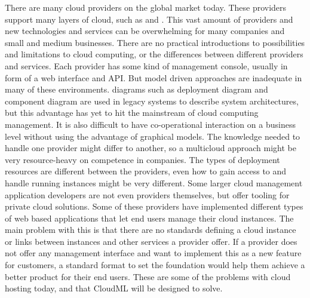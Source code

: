 There are many cloud providers on the global market today. 
These providers support many layers of cloud, such as  and .
This vast amount of providers and new technologies and services can be overwhelming 
for many companies and small and medium businesses. 
There are no practical introductions to possibilities and limitations to cloud computing, 
or the differences between different providers and services. 
Each provider has some kind of management console, usually in form of a web interface and API. 
But model driven approaches are inadequate in many of these environments. 
 diagrams such as deployment diagram and component diagram are used in legacy systems 
to describe system architectures, 
but this advantage has yet to hit the mainstream of cloud computing management. 
It is also difficult to have co-operational interaction on a business level without 
using the advantage of graphical models.
The knowledge needed to handle one provider might differ to another, 
so a multicloud approach might be very resource-heavy on competence in companies. 
The types of deployment resources are different between the providers, 
even how to gain access to and handle running instances might be very different. 
Some larger cloud management application developers are not even providers themselves, 
but offer tooling for private cloud solutions.
Some of these providers have implemented different types of web based applications 
that let end users manage their cloud instances. 
The main problem with this is that there are no standards defining a 
cloud instance or links between instances and other services a provider offer.
If a provider does not offer any management interface and want to implement this as a new feature for customers, 
a standard format to set the foundation would help them achieve a better product for their end users.
These are some of the problems with cloud hosting today, and that CloudML will be designed to solve.
